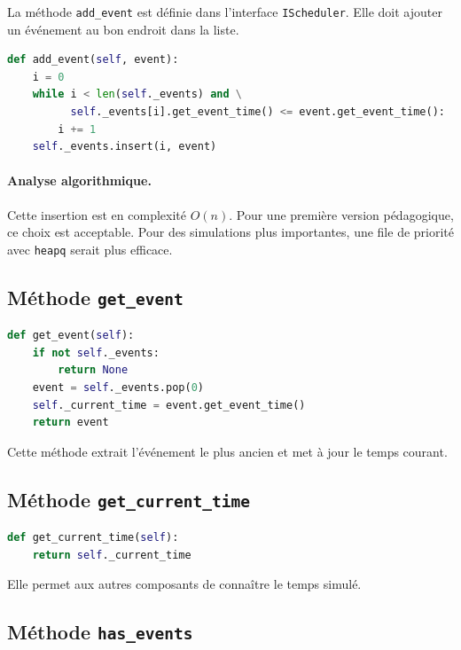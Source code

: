 \documentclass{article}
\begin{document}
La méthode \texttt{add\_event} est définie dans l’interface \texttt{IScheduler}. Elle doit ajouter un événement au bon endroit dans la liste.

\begin{lstlisting}[language=Python, caption=Principe d'insertion chronologique]
def add_event(self, event):
    i = 0
    while i < len(self._events) and \
          self._events[i].get_event_time() <= event.get_event_time():
        i += 1
    self._events.insert(i, event)
\end{lstlisting}

\paragraph{Analyse algorithmique.}
Cette insertion est en complexité \(O(n)\). Pour une première version pédagogique, ce choix est acceptable. Pour des simulations plus importantes, une file de priorité avec \texttt{heapq} serait plus efficace.

\subsection{Méthode \texttt{get\_event}}

\begin{lstlisting}[language=Python, caption=Principe de get_event]
def get_event(self):
    if not self._events:
        return None
    event = self._events.pop(0)
    self._current_time = event.get_event_time()
    return event
\end{lstlisting}

Cette méthode extrait l’événement le plus ancien et met à jour le temps courant.

\subsection{Méthode \texttt{get\_current\_time}}

\begin{lstlisting}[language=Python, caption=Principe de get_current_time]
def get_current_time(self):
    return self._current_time
\end{lstlisting}

Elle permet aux autres composants de connaître le temps simulé.

\subsection{Méthode \texttt{has\_events}}
\end{document}

